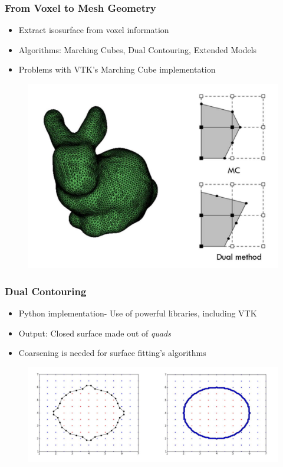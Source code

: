 \begin{frame}

	\frametitle{From Voxel to Mesh Geometry}
	
	\begin{itemize}
	\item Extract isosurface from voxel information
	\item Algorithms: Marching Cubes, Dual Contouring, Extended Models
	\item Problems with VTK's Marching Cube implementation
	\end{itemize}
	\begin{figure}
	\includegraphics[scale=0.35]{Pictures/bunny_MC.pdf}
	\end{figure}
	
\end{frame}

\begin{frame}

	\frametitle{Dual Contouring}
	
	\begin{itemize}
	\item Python implementation- Use of powerful libraries, including VTK
	\item Output: Closed surface made out of \textit{quads}
	\item Coarsening is needed for surface fitting's algorithms
	\end{itemize}
	\begin{figure}
	\includegraphics[scale=0.35]{Pictures/DC/DC_1.pdf}
	\end{figure}
	
\end{frame}

